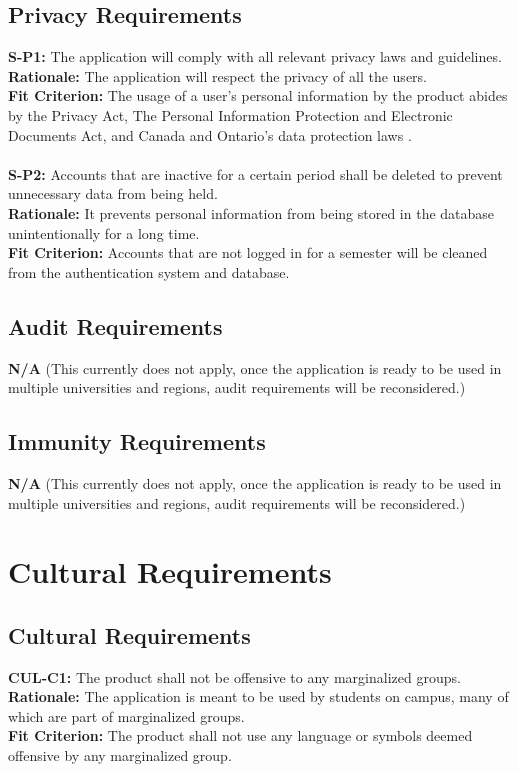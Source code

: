 \documentclass[12pt]{article}
\begin{document}
\subsection{Privacy Requirements}
  \textbf{S-P1:} The application will comply with all relevant privacy laws and guidelines.\\
  \textbf{Rationale:} The application will respect the privacy of all the users.\\
  \textbf{Fit Criterion:} The usage of a user's personal information by the product abides by the Privacy Act, The Personal Information Protection and Electronic Documents Act, and Canada and Ontario’s data protection laws \cite{Legislative Services} \cite{CFLC}.\\\\
  \textbf{S-P2:} Accounts that are inactive for a certain period shall be deleted to prevent unnecessary data from being held.\\
  \textbf{Rationale:} It prevents personal information from being stored in the database unintentionally for a long time.\\
  \textbf{Fit Criterion:} Accounts that are not logged in for a semester will be cleaned from the authentication system and database.

\subsection{Audit Requirements}
  \textbf{N/A} (This currently does not apply, once the application is ready to be used in multiple universities and regions, audit requirements will be reconsidered.)\\

\subsection{Immunity Requirements}
  \textbf{N/A} (This currently does not apply, once the application is ready to be used in multiple universities and regions, audit requirements will be reconsidered.)\\

\section{Cultural Requirements}
\subsection{Cultural Requirements}
  \textbf{CUL-C1:} The product shall not be offensive to any marginalized groups.\\
  \textbf{Rationale:} The application is meant to be used by students on campus, many of which are part of marginalized groups.\\
  \textbf{Fit Criterion:} The product shall not use any language or symbols deemed offensive by any marginalized group.\\\\
\end{document}
